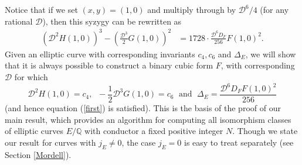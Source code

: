 \documentclass[11pt]{report}
\theoremstyle{definition}
\begin{document}
Notice that if we set $(x,y)=(1,0)$ and multiply through by $\mathcal{D}^6/4$ (for any rational $\mathcal{D}$), then
this syzygy can be rewritten as
\begin{align*}
  ( \mathcal{D}^2 H(1,0))^3 - \left( \frac{\mathcal{D}^3}{2} G(1,0) \right)^2
  &=  1728 \cdot \frac{\mathcal{D}^6 D_F}{256} F(1,0)^2.
\end{align*}
Given an elliptic curve with corresponding invariants $c_4, c_6$ and $\Delta_E$, we will show that it is always possible to construct a binary
cubic form $F$, with corresponding  $\mathcal{D}$ for which
$$
\mathcal{D}^2 H(1,0) = c_4, \; \; -\frac{1}{2} \mathcal{D}^3 G(1,0) = c_6 \; \mbox{ and } \; \Delta_E =  \frac{\mathcal{D}^6  D_F F(1,0)^2}{256}
$$
(and hence equation (\ref{first}) is satisfied). This is the basis of the proof of our main result, which provides an algorithm for computing all isomorphism classes of elliptic curves $E/\mathbb{Q}$ with conductor a fixed positive integer $N$. Though we state our result for curves with $j_E \neq 0$, the case $j_E=0$ is easy to treat separately (see Section \ref{Mordell}).
\end{document}
